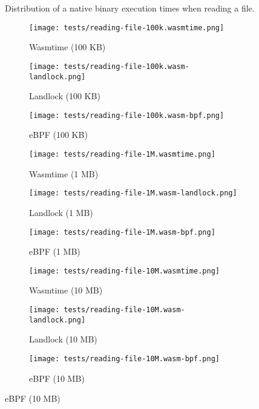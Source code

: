 \begin{figure}[ht!]
  \caption{Distribution of a native binary execution times when reading a file.}
  \label{fig:distribution-reading-native}
\end{figure}

\begin{figure}[ht!]
  \centering
  \begin{subfigure}[b]{0.32\textwidth}
    \centering
    \texttt{[image: tests/reading-file-100k.wasmtime.png]}
    \caption{Wasmtime (100 KB)}
  \end{subfigure}
  \begin{subfigure}[b]{0.32\textwidth}
    \centering
    \texttt{[image: tests/reading-file-100k.wasm-landlock.png]}
    \caption{Landlock (100 KB)}
  \end{subfigure}
  \begin{subfigure}[b]{0.32\textwidth}
    \centering
    \texttt{[image: tests/reading-file-100k.wasm-bpf.png]}
    \caption{eBPF (100 KB)}
  \end{subfigure}

  \begin{subfigure}[b]{0.32\textwidth}
    \centering
    \texttt{[image: tests/reading-file-1M.wasmtime.png]}
    \caption{Wasmtime (1 MB)}
  \end{subfigure}
  \begin{subfigure}[b]{0.32\textwidth}
    \centering
    \texttt{[image: tests/reading-file-1M.wasm-landlock.png]}
    \caption{Landlock (1 MB)}
  \end{subfigure}
  \begin{subfigure}[b]{0.32\textwidth}
    \centering
    \texttt{[image: tests/reading-file-1M.wasm-bpf.png]}
    \caption{eBPF (1 MB)}
  \end{subfigure}

  \begin{subfigure}[b]{0.32\textwidth}
    \centering
    \texttt{[image: tests/reading-file-10M.wasmtime.png]}
    \caption{Wasmtime (10 MB)}
  \end{subfigure}
  \begin{subfigure}[b]{0.32\textwidth}
    \centering
    \texttt{[image: tests/reading-file-10M.wasm-landlock.png]}
    \caption{Landlock (10 MB)}
  \end{subfigure}
  \begin{subfigure}[b]{0.32\textwidth}
    \centering
    \texttt{[image: tests/reading-file-10M.wasm-bpf.png]}
    \caption{eBPF (10 MB)}
  \end{subfigure}


\end{figure}
